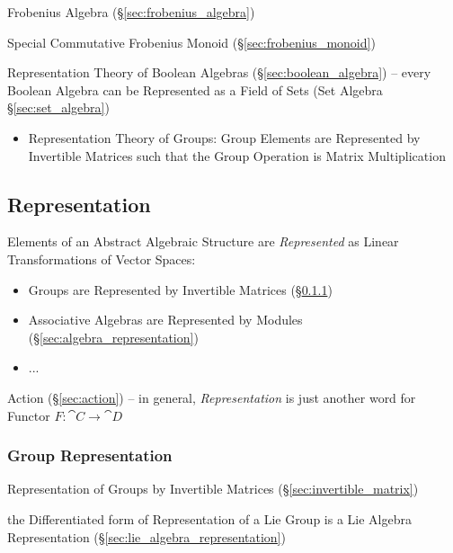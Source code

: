 Frobenius Algebra (\S\ref{sec:frobenius_algebra})

Special Commutative Frobenius Monoid (\S\ref{sec:frobenius_monoid})

Representation Theory of Boolean Algebras (\S\ref{sec:boolean_algebra}) -- every
Boolean Algebra can be Represented as a Field of Sets (Set Algebra
\S\ref{sec:set_algebra})

\begin{itemize}
  \item Representation Theory of Groups: Group Elements are Represented by
    Invertible Matrices such that the Group Operation is Matrix Multiplication
\end{itemize}



\subsection{Representation}\label{sec:representation}

Elements of an Abstract Algebraic Structure are \emph{Represented} as Linear
Transformations of Vector Spaces:
\begin{itemize}
  \item Groups are Represented by Invertible Matrices
    (\S\ref{sec:group_representation})
  \item Associative Algebras are Represented by Modules
    (\S\ref{sec:algebra_representation})
  \item ...
\end{itemize}

Action (\S\ref{sec:action}) -- in general, \emph{Representation} is just another
word for Functor $F : \cat{C} \rightarrow \cat{D}$



\subsubsection{Group Representation}\label{sec:group_representation}

Representation of Groups by Invertible Matrices (\S\ref{sec:invertible_matrix})

the Differentiated form of Representation of a Lie Group is a Lie Algebra
Representation (\S\ref{sec:lie_algebra_representation})



